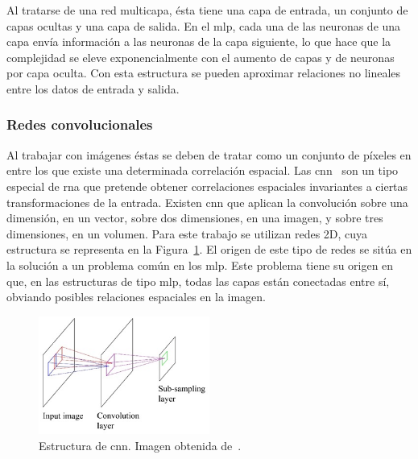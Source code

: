 Al tratarse de una red multicapa, ésta tiene una capa de entrada, un conjunto de capas ocultas y una capa de salida. En el \acrshort{mlp}, cada una de las neuronas de una capa envía información a las neuronas de la capa siguiente, lo que hace que la complejidad se eleve exponencialmente con el aumento de capas y de neuronas por capa oculta. Con esta estructura se pueden aproximar relaciones no lineales entre los datos de entrada y salida. 

\subsubsection{Redes convolucionales} \label{ap.cnn}
Al trabajar con imágenes éstas se deben de tratar como un conjunto de píxeles en entre los que existe una determinada correlación espacial. Las \acrfull{cnn}~\cite{cnn} son un tipo especial de \acrshort{rna} que pretende obtener correlaciones espaciales invariantes a ciertas transformaciones de la entrada. Existen \acrshort{cnn} que aplican la convolución sobre una dimensión, en un vector, sobre dos dimensiones, en una imagen, y sobre tres dimensiones, en un volumen. Para este trabajo se utilizan redes 2D, cuya estructura se representa en la Figura~\ref{fig.cnn}. El origen de este tipo de redes se sitúa en  la solución a un problema común en los \acrshort{mlp}. Este problema tiene su origen en que, en las estructuras de tipo \acrshort{mlp}, todas las capas están conectadas entre sí, obviando posibles relaciones espaciales en la imagen. 

\vspace{5pt}
\begin{figure}[H]
	\begin{center}
		\includegraphics[width=0.5\textwidth]{ figures/intro/cnn.png}
		\caption{Estructura de \acrshort{cnn}. Imagen obtenida de~\cite{cnn}.}
		\label{fig.cnn}
	\end{center}
\end{figure}
\vspace{-10pt}

